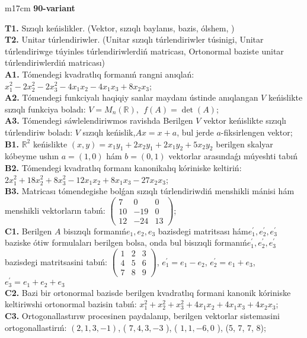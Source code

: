\documentclass{article}
\begin{document}
\begin{tabular}{m{17cm}}
\textbf{90-variant}
\newline

\textbf{T1.} Sızıqlı keńislikler.   (Vektor,  sızıqlı baylanıs, bazis, ólshem, )  \\
\textbf{T2.} Unitar túrlendiriwler. (Unitar sızıqlı túrlendiriwler túsinigi,  Unitar túrlendiriwge túyinles túrlendiriwlerdiń matricası,   Ortonormal baziste unitar túrlendiriwlerdiń matricası) \\
\textbf{A1.} Tómendegi kvadratlıq formanıń rangni anıqlań: \(x_{1}^{2} - 2x_{2}^{2} - 2x_{3}^{2} - 4x_{1}x_{2} - 4x_{1}x_{3} + 8x_{2}x_{3}\); \\
\textbf{A2.} Tómendegi funkciyalı haqiqiy sanlar maydanı ústinde anıqlangan \(V\) keńislikte sızıqlı funkciya boladı: \(V = M_{n}\left( \mathbb{R} \right),\ \ f(A) = \det(A)\); \\
\textbf{A3.} Tómendegi sáwlelendiriwmos ravishda Berilgen \(V\) vektor keńislikte sızıqlı túrlendiriw boladı: \(V\) sızıqlı keńislik,\(Ax = x + a\), bul jerde \(a\)-fiksirlengen vektor; \\
\textbf{B1.} \(\mathbb{R}^{2}\) keńislikte \((x,y) = x_{1}y_{1} + 2x_{2}y_{1} + 2x_{1}y_{2} + 5x_{2}y_{2}\) berilgen skalyar kóbeyme ushın \(a = (1,0)\) hám \(b = (0,1)\) vektorlar arasındaǵı múyeshti tabıń \\
\textbf{B2.} Tómendegi kvadratlıq formanı kanonikalıq kóriniske keltiriń: \(2x_{1}^{2} + 18x_{2}^{2} + 8x_{3}^{2} - 12x_{1}x_{2} + 8x_{1}x_{3} - 27x_{2}x_{3}\); \\
\textbf{B3.} Matricası tómendegishe bolǵan sızıqlı túrlendiriwdiń menshikli mánisi hám menshikli vektorların tabıń: \(\begin{pmatrix} 7 & 0 & 0 \\ 10 & - 19 & 0 \\ 12 & - 24 & 13 \end{pmatrix}\); \\
\textbf{C1.} Berilgen \(A\) bisızıqlı formanıń\(e_{1},e_{2},e_{3}\) bazisdegi matritsası hám\(e_{1}^{'},e_{2}^{'},e_{3}^{'}\) baziske ótiw formulaları berilgen bolsa, onda bul bisızıqli formanıń\(e_{1}^{'},e_{2}^{'},e_{3}^{'}\) bazisdegi matritsasini tabıń: \(\begin{pmatrix} 1 & 2 & 3 \\ 4 & 5 & 6 \\ 7 & 8 & 9 \end{pmatrix}\), \(e_{1}^{'} = e_{1} - e_{2}\), \(e_{2}^{'} = e_{1} + e_{3}\), \(e_{3}^{'} = e_{1} + e_{2} + e_{3}\) \\
\textbf{C2.} Bazi bir ortonormal bazisde berilgen kvadratlıq formani kanonik kóriniske keltiriwshi ortonormal bazisin tabıń: \(x_{1}^{2} + x_{2}^{2} + x_{3}^{2} + 4x_{1}x_{2} + 4x_{1}x_{3} + 4x_{2}x_{3}\); \\
\textbf{C3.} Ortogonallastırıw procesinen paydalanıp, berilgen vektorlar sistemasini ortogonallastirıń: \((2,1,3, - 1)\), ( \(7,4,3, - 3\) ), ( \(1,1, - 6,0\) ), (5, 7, 7, 8); \\

\end{tabular}
\vspace{1cm}
\end{document}
